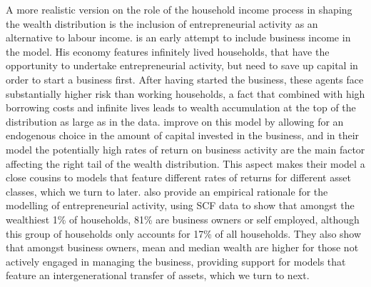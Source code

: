 A more realistic version on the role of the household income process in shaping
the wealth distribution is the inclusion of entrepreneurial activity as an
alternative to labour income. \citet{Quadrini2000} is an early attempt to 
include business income in the model. His economy features infinitely lived 
households, that have the opportunity to undertake entrepreneurial activity, but
need to save up capital in order to start a business first. After having started
the business, these agents face substantially higher risk than working households,
a fact that combined with high borrowing costs and infinite lives leads to 
wealth accumulation at the top of the distribution as large as in the data. 
\citet{CagettiDeNardi2006} improve on this model by allowing for an endogenous
choice in the amount of capital invested in the business, and in their model the
potentially high rates of return on business activity are the main factor 
affecting the right tail of the wealth distribution. This aspect makes their 
model a close cousins to models that feature different rates of returns for 
different asset classes, which we turn to later. \citet{CagettiDeNardi2006}
also provide an empirical rationale for the modelling of entrepreneurial 
activity, using SCF data to show that amongst the wealthiest 1\% of households,
81\% are business owners or self employed, although this group of households 
only accounts for 17\% of all households. They also show that amongst business
owners, mean and median wealth are higher for those not actively engaged in 
managing the business, providing support for models that feature an intergenerational
transfer of assets, which we turn to next.

